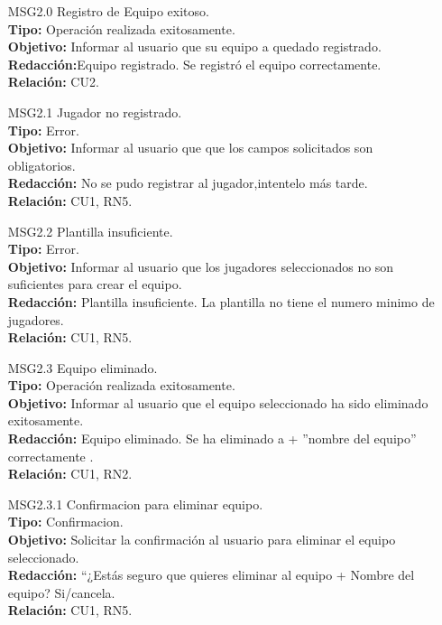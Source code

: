 \begin{itemize}
	 \item[MSG2.0] Registro de Equipo exitoso.\\
	 \textbf{Tipo:}  Operación realizada exitosamente.\\
	 \textbf{Objetivo:} Informar al usuario que su equipo a quedado registrado.\\
	 \textbf{Redacción:}Equipo registrado. Se registró el equipo correctamente.\\	 
	 \textbf{Relación:} CU2.
	 	 
	 \item[MSG2.1] Jugador no registrado.\\
	 \textbf{Tipo:} Error.\\
	 \textbf{Objetivo:} Informar al usuario que que los campos solicitados son obligatorios.\\
	 \textbf{Redacción:} No se pudo registrar al jugador,intentelo más tarde.\\	 
	 \textbf{Relación:} CU1, RN5.
	 
	 \item[MSG2.2] Plantilla insuficiente.\\
	 \textbf{Tipo:} Error.\\
	 \textbf{Objetivo:} Informar al usuario que los jugadores seleccionados no son suficientes para crear el equipo.\\
	 \textbf{Redacción:} Plantilla insuficiente. La plantilla no tiene el numero minimo de jugadores.\\
	 \textbf{Relación:} CU1, RN5.
	 
	 \item[MSG2.3] Equipo eliminado.\\
	 \textbf{Tipo:} Operación realizada exitosamente.\\
	 \textbf{Objetivo:} Informar al usuario que el equipo seleccionado ha sido eliminado exitosamente.\\
	 \textbf{Redacción:} Equipo eliminado. Se ha eliminado a + ”nombre del equipo” correctamente . \\
	 \textbf{Relación:} CU1, RN2.
	 
	 \item[MSG2.3.1] Confirmacion para eliminar equipo.\\
	 \textbf{Tipo:} Confirmacion.\\
	 \textbf{Objetivo:} Solicitar la confirmación al usuario para eliminar el equipo seleccionado.\\
	 \textbf{Redacción:} “¿Estás seguro que quieres eliminar al equipo + Nombre del equipo? Si/cancela.\\
	 \textbf{Relación:} CU1, RN5.
	 

\end{itemize}
